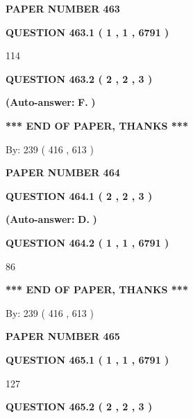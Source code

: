 \documentclass[12pt]{article}
\begin{document}
   
\newpage 
\setcounter{page}{ 
   463001 } 
   
   
 {\textbf{ \Large{ PAPER NUMBER  463  }}}
   
   
   
   
  
  
{\textbf{\large{QUESTION
463.1 
 ( 1 , 1 , 6791 )
}}}

114
  
  
{\textbf{\large{QUESTION
463.2 
 ( 2 , 2 , 3 )
}}}
 
 
{\textbf{(Auto-answer:}}
{\textbf{\large{
F.}}}
{\textbf{)}}
 
 
   
   
   
   
\vspace{1.0in} 
{\textbf{\large{ *** END OF PAPER, THANKS *** }}} 
   
   
\hspace{1.0in} By: 
 239 ( 416 ,  613 )
   
   
   
   
\newpage 
\setcounter{page}{ 
   464001 } 
   
   
 {\textbf{ \Large{ PAPER NUMBER  464  }}}
   
   
   
   
  
  
{\textbf{\large{QUESTION
464.1 
 ( 2 , 2 , 3 )
}}}
 
 
{\textbf{(Auto-answer:}}
{\textbf{\large{
D.}}}
{\textbf{)}}
 
 
  
  
{\textbf{\large{QUESTION
464.2 
 ( 1 , 1 , 6791 )
}}}

86
   
   
   
   
\vspace{1.0in} 
{\textbf{\large{ *** END OF PAPER, THANKS *** }}} 
   
   
\hspace{1.0in} By: 
 239 ( 416 ,  613 )
   
   
   
   
\newpage 
\setcounter{page}{ 
   465001 } 
   
   
 {\textbf{ \Large{ PAPER NUMBER  465  }}}
   
   
   
   
  
  
{\textbf{\large{QUESTION
465.1 
 ( 1 , 1 , 6791 )
}}}

127
  
  
{\textbf{\large{QUESTION
465.2 
 ( 2 , 2 , 3 )
}}}
 
\end{document}
